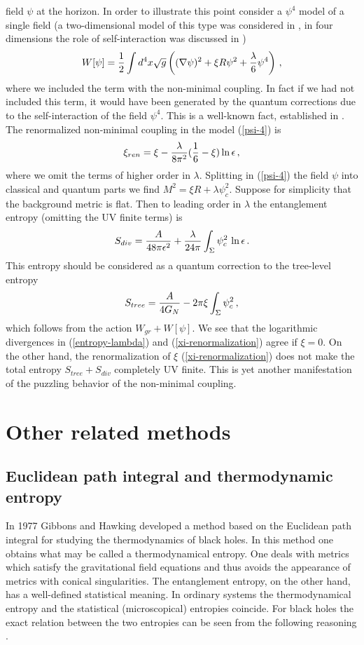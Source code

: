 \documentclass[12pt]{article}
\def\be{\begin{eqnarray}}
\def\ee{\end{eqnarray}}
\def\lb{\label}
\def\o{\over}
\begin{document}
field $\psi$ at the horizon. In order to illustrate this point consider a  $\psi^4$ model of a single field
(a two-dimensional   model of this type was considered in \cite{Kabat:1995jq}, in four dimensions the role of self-interaction was discussed in \cite{Cognola:1993qg})
\be
W[\psi]={1\o 2}\int d^4x\sqrt{g}\left((\nabla\psi)^2+\xi R \psi^2+{\lambda\o 6}\psi^4\right)\, ,
\lb{psi-4}
\ee
where we included the term with the non-minimal coupling. In fact if we had not  included this term, it would have been generated by the quantum corrections
due to the self-interaction of the field $\psi^4$. This is a well-known fact, established in \cite{Nelson:1982kt}. The renormalized  non-minimal  coupling in the model (\ref{psi-4}) is 
\be
\xi_{ren}=\xi-{\lambda\o 8\pi^2}({1\o 6}-\xi)\ln\epsilon\, ,
\lb{xi-renormalization}
\ee
where we omit the terms of higher order in $\lambda$.
 Splitting in (\ref{psi-4})
the field $\psi$ into classical and quantum parts we find  $M^2=\xi R+\lambda\psi_c^2$. Suppose for simplicity that the background metric is
flat. Then to leading order in $\lambda$ the entanglement entropy (omitting the UV finite terms) is
\be
S_{div}={A\o 48\pi\epsilon^2}+{\lambda\o 24\pi}\int_\Sigma\psi_c^2\, \ln\epsilon\, .
\lb{entropy-lambda}
\ee
This entropy should be considered as a quantum correction to the tree-level entropy
\be
S_{tree}={A\o 4G_N}-2\pi\xi\int_\Sigma\psi^2_c\, ,
\lb{entropy-xi}
\ee
which follows from the action $W_{gr}+W[\psi]$.
We see that the logarithmic divergences in (\ref{entropy-lambda}) and (\ref{xi-renormalization})  agree if $\xi=0$. On the other hand, the renormalization of $\xi$ (\ref{xi-renormalization}) does not make the total entropy
 $S_{tree}+S_{div}$ completely UV finite. This is yet another manifestation of the puzzling behavior of the non-minimal coupling.





\section{ Other related methods}
 \subsection{ Euclidean path integral and thermodynamic entropy }
 \label{section: Euclidean approach}
In 1977 Gibbons and Hawking \cite{Gibbons:1976ue} developed a method based on the Euclidean path integral for studying the thermodynamics of black holes. In this method one obtains what may be called a thermodynamical entropy. One deals with metrics which satisfy the gravitational field equations 
and thus avoids the appearance of metrics with conical singularities. The entanglement entropy, on the other hand,  has a well-defined statistical meaning.
In ordinary systems the thermodynamical entropy and the statistical (microscopical) entropies coincide. For black holes the exact relation between the two entropies can be  seen from the following reasoning   \cite{Solodukhin:1995ak}.
\end{document}
